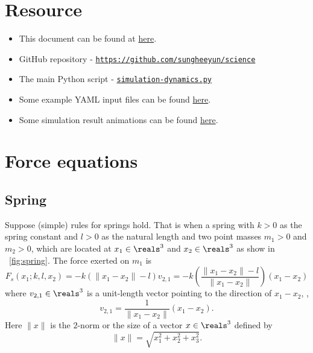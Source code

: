 \documentclass{article}
\begin{document}
\section{Resource}

\begin{itemize}
\item
	This document can be found at \href{https://github.com/sungheeyun/science/blob/main/docs/dynamics-equations.pdf}{here}.

\item
	GitHub repository - {\tt \href{https://github.com/sungheeyun/science}{https://github.com/sungheeyun/science}}

\item
	The main Python script - {\tt \href{https://github.com/sungheeyun/science/blob/main/bin/simulation-dynamics.py}{simulation-dynamics.py}}

\item
	Some example YAML input files can be found \href{https://github.com/sungheeyun/science/tree/main/data/input}{here}.

\item
	Some simulation result animations can be found \href{https://github.com/sungheeyun/science/tree/main/animations}{here}.
\end{itemize}


\section{Force equations}

\subsection{Spring}

Suppose (simple) rules for springs hold. That is when a spring with $k>0$ as the spring constant and $l>0$ as the natural length
and two point masses $m_1>0$ and $m_2>0$, which are located at
$x_1\in\reals^3$
and
$x_2\in\reals^3$
as show in \figurename~\ref{fig:spring}.
The force exerted on $m_1$ is
\begin{equation}
\label{eq:force:spring}
	F_s(x_1;k,l,x_2) = -k (\|x_1-x_2\| - l) v_{2,1}
	= -k
	\left(
	\frac{\|x_1-x_2\| - l}{\|x_1-x_2\|}
	\right)
	(x_1-x_2)
\end{equation}
where $v_{2,1}\in\reals^3$ is a unit-length vector pointing to the direction of $x_1-x_2$,
\ie,
\[
	v_{2,1} =
	\frac{1}{\|x_1-x_2\|}
	(x_1-x_2).
\]
Here $\|x\|$ is the $2$-norm or the size of a vector $x\in\reals^3$ defined by
\[
	\|x\| = \sqrt{x_1^2+x_2^2+x_3^2}.
\]
\end{document}
